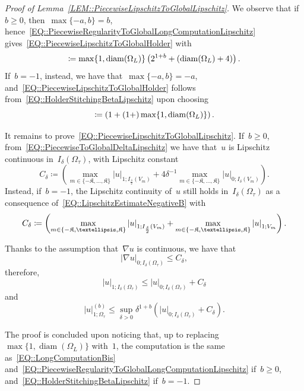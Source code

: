\documentclass[10pt,a4paper]{amsart}
\makeatletter
\newcommand{\abs}[1]{\left\lvert#1\right\rvert}
\newcommand{\const}[1]{%
  \csname const@#1\endcsname%
}
\newcommand{\constapp}[1]{%
  \csname constapp@#1\endcsname%
}
\renewcommand{\geq}{\geqslant}
\renewcommand{\leq}{\leqslant}
\makeatother
\begin{document}
\begin{proof}[Proof of Lemma~\ref{LEM::PiecewiseLipschitzToGlobalLipschitz}]
    We observe that if~$b \geq 0$, then~$\max\{-a,b\} = b$, hence~\eqref{EQ::PiecewiseRegularityToGlobalLongComputationLipschitz} gives~\eqref{EQ::PiecewiseLipschitzToGlobalHolder} with
    \[\const{CONST::PiecewiseLipschitzToGlobalLipschitz} \coloneq \max\{1,\operatorname{diam}(\Omega_L)\} \left(2^{1+b} + \constapp{CONST::HolderEmbeddingA}\left(\operatorname{diam}(\Omega_L) + 4\right)\right).\]
    If~$b = -1$, instead, we have that~$\max\{-a,b\} = -a$, and~\eqref{EQ::PiecewiseLipschitzToGlobalHolder} follows from~\eqref{EQ::HolderStitchingBetaLipschitz} upon choosing
    \[\const{CONST::PiecewiseLipschitzToGlobalLipschitz} \coloneq \left(1+(1+\constapp{CONST::Quasiconvexity}) \max\{1,\operatorname{diam}(\Omega_L)\}\right).\]

    It remains to prove~\eqref{EQ::PiecewiseLipschitzToGlobalLipschitz}. If~$b \geq 0$, from~\eqref{EQ::PiecewiseToGlobalDeltaLipschitz} we have that~$u$ is Lipschitz continuous in~$I_\delta(\Omega_\tau)$, with Lipschitz constant
    \[C_{\delta} \coloneq \left(\max_{m \in \{-\mathfrak{K},\dots,\mathfrak{K}\}} \abs{u}_{1; I_{\frac{\delta}{2}}(V_m)} + 4{\delta^{-1}}\max_{m \in \{-\mathfrak{K},\dots,\mathfrak{K}\}}\abs{u}_{0;I_\delta(V_m)}\right).\]
    Instead, if~$b = -1$, the Lipschitz continuity of~$u$ still holds in~$I_\delta(\Omega_\tau)$ as a consequence of~\eqref{EQ::LipschitzEstimateNegativeB} with
    \[C_{\delta} \coloneq \left(\max_{m \in \{-\mathfrak{K},\dots,\mathfrak{K}\}} \abs{u}_{1; I_{\frac{\delta}{2}}(V_m)} + \constapp{CONST::Quasiconvexity} \max_{m \in \{-\mathfrak{K},\dots,\mathfrak{K}\}}\abs{u}_{1; V_{m}}\right).\]

    Thanks to the assumption that~$\nabla u$ is continuous, we have that
    \begin{equation}
        \abs{\nabla u}_{0; I_\delta(\Omega_\tau)} \leq C_{\delta},
    \end{equation}
    therefore,
    \begin{equation}
        \abs{u}_{1; I_\delta(\Omega_\tau)} \leq \abs{u}_{0; I_\delta(\Omega_\tau)} + C_\delta
    \end{equation}
    and
    \begin{equation}
        \abs{u}_{1; \Omega_\tau}^{(b)} \leq \sup_{\delta > 0} \delta^{1+b} (\abs{u}_{0; I_\delta(\Omega_\tau)}+C_\delta).
    \end{equation}

    The proof is concluded upon noticing that, up to replacing~$\max\{1,\operatorname{diam}(\Omega_L)\}$ with~$1$, the computation is the same as~\eqref{EQ::LongComputationBis} and~\eqref{EQ::PiecewiseRegularityToGlobalLongComputationLipschitz} if~$b \geq 0$, and~\eqref{EQ::HolderStitchingBetaLipschitz} if~$b = -1$.
\end{proof}
\end{document}
